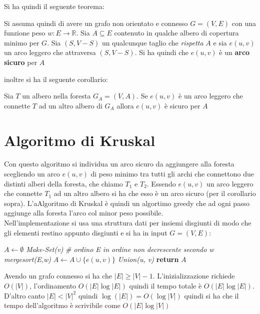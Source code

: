 \documentclass[a4paper,12pt, oneside]{book}
\begin{document}
Si ha quindi il seguente teorema:
\begin{teorema}
  Si assuma quindi di avere un grafo non orientato e connesso $G=(V,E)$
  con una funzione peso $w:E\to\mathbb{R}$. Sia $A\subseteq E$
  contenuto in qualche albero di copertura minimo per $G$. Sia
  $(S,V-S)$ un qualcunque taglio che \textit{rispetta} $A$ e sia
  $e(u,v)$ un arco leggero che attraversa $(S,V-S)$. Si ha quindi che
  $e(u,v)$ è un \textbf{arco sicuro} per $A$
\end{teorema}
inoltre si ha il seguente corollario:
\begin{corollario}
  Sia $T$ un albero nella foresta $G_A=(V,A)$. Se $e(u,v)$ è un arco
  leggero che connette $T$ ad un altro albero di $G_A$ allora $e(u,v)$
  è sicuro per $A$
\end{corollario}
\newpage
\section{Algoritmo di Kruskal}
Con questo algoritmo si individua un arco sicuro da aggiungere alla
foresta scegliendo un arco $e(u,v)$ di peso minimo tra tutti gli archi
che connettono due distinti alberi della foresta, che chiamo $T_1$ e
$T_2$. Essendo $e(u,v)$ un arco leggero che connette $T_1$ ad un altro
albero si ha che esso è un arco sicuro (per il corollario
sopra). L'aAlgoritmo di Kruskal è quindi un algortimo greedy che ad
ogni passo aggiunge alla foresta l'arco col minor peso
possibile.\\
Nell'implementazione si usa una struttura dati per insiemi
disgiunti di modo che gli elementi restino appunto disgiunti e si ha
in input $G=(V,E)$:
\begin{algorithm}[H]
  \begin{algorithmic}
    \State $A\gets \emptyset$
    \State \textit{Make-Set(v)}
    \EndFor
    \State \textit{\# ordino E in ordine non decrescente secondo w}
    \State \textit{mergesort(E,w)}
    \State $A\gets A\cup\{e(u,v)\}$
    \State \textit{Union(u, v)}
    \EndIf
    \EndFor
    \State \textbf{return} $A$
    \EndFunction
  \end{algorithmic}
\end{algorithm}
Avendo un grafo connesso si ha che $|E|\geq |V|-1$. L'inizializzazione
richiede $O(|V|)$, l'ordinamento $O(|E|\log |E|)$ quindi il tempo
totale è $O(|E|\log |E|)$. D'altro canto $|E|<|V|^2$ quindi $\log
(|E|)=O(\log |V|)$ quindi si ha che il tempo dell'algoritmo è
scrivibile come $O(|E|\log |V|)$
\end{document}
